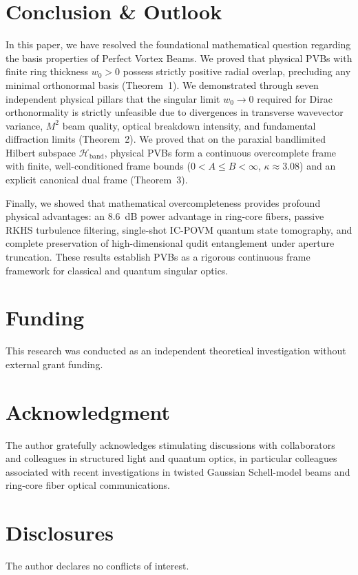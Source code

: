 \documentclass{optica-article}
\begin{document}
\section{Conclusion \& Outlook}
\label{sec:conclusion}

In this paper, we have resolved the foundational mathematical question regarding the basis properties of Perfect Vortex Beams. We proved that physical PVBs with finite ring thickness $w_0 > 0$ possess strictly positive radial overlap, precluding any minimal orthonormal basis (Theorem~1). We demonstrated through seven independent physical pillars that the singular limit $w_0 \to 0$ required for Dirac orthonormality is strictly unfeasible due to divergences in transverse wavevector variance, $M^2$ beam quality, optical breakdown intensity, and fundamental diffraction limits (Theorem~2). We proved that on the paraxial bandlimited Hilbert subspace $\mathcal{H}_{\text{band}}$, physical PVBs form a continuous overcomplete frame with finite, well-conditioned frame bounds ($0 < A \le B < \infty$, $\kappa \approx 3.08$) and an explicit canonical dual frame (Theorem~3).

Finally, we showed that mathematical overcompleteness provides profound physical advantages: an 8.6~dB power advantage in ring-core fibers, passive RKHS turbulence filtering, single-shot IC-POVM quantum state tomography, and complete preservation of high-dimensional qudit entanglement under aperture truncation. These results establish PVBs as a rigorous continuous frame framework for classical and quantum singular optics.

\section*{Funding}
This research was conducted as an independent theoretical investigation without external grant funding.

\section*{Acknowledgment}
The author gratefully acknowledges stimulating discussions with collaborators and colleagues in structured light and quantum optics, in particular colleagues associated with recent investigations in twisted Gaussian Schell-model beams and ring-core fiber optical communications.

\section*{Disclosures}
The author declares no conflicts of interest.
\end{document}
